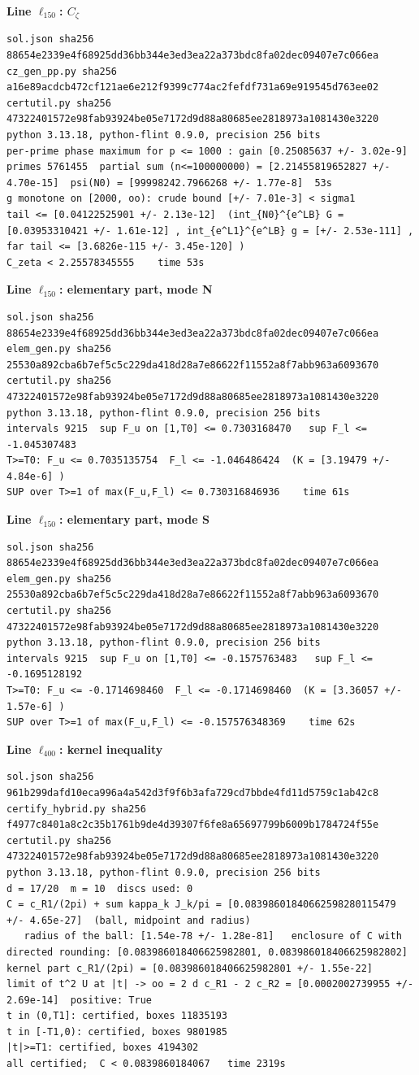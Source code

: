 \documentclass[11pt,reqno]{amsart}
\numberwithin{equation}{section}
\theoremstyle{definition}
\theoremstyle{remark}
\newcommand{\appsub}[1]{\par\medskip\noindent\textbf{#1}\par\nobreak\smallskip}
\begin{document}
\appsub{Line $\ell_{150}$: $C_\zeta$}
\begin{lstlisting}
sol.json sha256 88654e2339e4f68925dd36bb344e3ed3ea22a373bdc8fa02dec09407e7c066ea
cz_gen_pp.py sha256 a16e89acdcb472cf121ae6e212f9399c774ac2fefdf731a69e919545d763ee02
certutil.py sha256 47322401572e98fab93924be05e7172d9d88a80685ee2818973a1081430e3220
python 3.13.18, python-flint 0.9.0, precision 256 bits
per-prime phase maximum for p <= 1000 : gain [0.25085637 +/- 3.02e-9]
primes 5761455  partial sum (n<=100000000) = [2.21455819652827 +/- 4.70e-15]  psi(N0) = [99998242.7966268 +/- 1.77e-8]  53s
g monotone on [2000, oo): crude bound [+/- 7.01e-3] < sigma1
tail <= [0.04122525901 +/- 2.13e-12]  (int_{N0}^{e^LB} G = [0.03953310421 +/- 1.61e-12] , int_{e^L1}^{e^LB} g = [+/- 2.53e-111] , far tail <= [3.6826e-115 +/- 3.45e-120] )
C_zeta < 2.25578345555    time 53s
\end{lstlisting}
\appsub{Line $\ell_{150}$: elementary part, mode N}
\begin{lstlisting}
sol.json sha256 88654e2339e4f68925dd36bb344e3ed3ea22a373bdc8fa02dec09407e7c066ea
elem_gen.py sha256 25530a892cba6b7ef5c5c229da418d28a7e86622f11552a8f7abb963a6093670
certutil.py sha256 47322401572e98fab93924be05e7172d9d88a80685ee2818973a1081430e3220
python 3.13.18, python-flint 0.9.0, precision 256 bits
intervals 9215  sup F_u on [1,T0] <= 0.7303168470   sup F_l <= -1.045307483
T>=T0: F_u <= 0.7035135754  F_l <= -1.046486424  (K = [3.19479 +/- 4.84e-6] )
SUP over T>=1 of max(F_u,F_l) <= 0.730316846936    time 61s
\end{lstlisting}
\appsub{Line $\ell_{150}$: elementary part, mode S}
\begin{lstlisting}
sol.json sha256 88654e2339e4f68925dd36bb344e3ed3ea22a373bdc8fa02dec09407e7c066ea
elem_gen.py sha256 25530a892cba6b7ef5c5c229da418d28a7e86622f11552a8f7abb963a6093670
certutil.py sha256 47322401572e98fab93924be05e7172d9d88a80685ee2818973a1081430e3220
python 3.13.18, python-flint 0.9.0, precision 256 bits
intervals 9215  sup F_u on [1,T0] <= -0.1575763483   sup F_l <= -0.1695128192
T>=T0: F_u <= -0.1714698460  F_l <= -0.1714698460  (K = [3.36057 +/- 1.57e-6] )
SUP over T>=1 of max(F_u,F_l) <= -0.157576348369    time 62s
\end{lstlisting}
\appsub{Line $\ell_{400}$: kernel inequality}
\begin{lstlisting}
sol.json sha256 961b299dafd10eca996a4a542d3f9f6b3afa729cd7bbde4fd11d5759c1ab42c8
certify_hybrid.py sha256 f4977c8401a8c2c35b1761b9de4d39307f6fe8a65697799b6009b1784724f55e
certutil.py sha256 47322401572e98fab93924be05e7172d9d88a80685ee2818973a1081430e3220
python 3.13.18, python-flint 0.9.0, precision 256 bits
d = 17/20  m = 10  discs used: 0 
C = c_R1/(2pi) + sum kappa_k J_k/pi = [0.08398601840662598280115479 +/- 4.65e-27]  (ball, midpoint and radius)
   radius of the ball: [1.54e-78 +/- 1.28e-81]   enclosure of C with directed rounding: [0.083986018406625982801, 0.083986018406625982802]
kernel part c_R1/(2pi) = [0.083986018406625982801 +/- 1.55e-22]
limit of t^2 U at |t| -> oo = 2 d c_R1 - 2 c_R2 = [0.0002002739955 +/- 2.69e-14]  positive: True
t in (0,T1]: certified, boxes 11835193
t in [-T1,0): certified, boxes 9801985
|t|>=T1: certified, boxes 4194302
all certified;  C < 0.0839860184067   time 2319s
\end{lstlisting}
\end{document}
